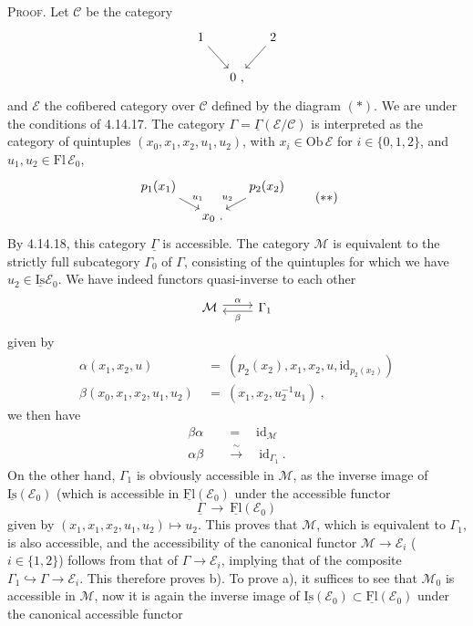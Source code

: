 \documentclass[11pt]{article}
\newcommand{\printedpage}[1]{\marginpar{\footnotesize p.~#1}}
\newcommand{\msp}[1]{\marginpar{\footnotesize [#1]}}
\newcommand{\uGamma}{\underline{\Gamma}}
\newcommand{\uFl}{\underline{\mathrm{Fl}}}
\newcommand{\uIs}{\underline{\mathrm{Is}}}
\newcommand{\Ob}{\mathrm{Ob}\,}
\newcommand{\Fl}{\mathrm{Fl}\,}
\newcommand{\id}{\mathrm{id}}
\begin{document}
\noindent\textsc{Proof}. Let $\mathcal{C}$ be the category
\[
\begin{tikzcd}[column sep=small]
1 \arrow[dr] & & 2 \arrow[dl] \\
& 0 \ , &
\end{tikzcd}
\]
and $\mathcal{E}$ the cofibered category over $\mathcal{C}$ defined by the diagram $(*)$. We are under the conditions of 4.14.17. The category $\Gamma = \uGamma(\mathcal{E}/\mathcal{C})$ is interpreted
\printedpage{151}
\msp{page 398}
as the category of quintuples $(x_0,x_1,x_2,u_1,u_2)$, with $x_i \in \Ob\mathcal{E}$ for $i \in \{0,1,2\}$, and $u_1, u_2 \in \Fl\mathcal{E}_0$,
\[
\begin{tikzcd}[column sep=small, row sep=small]
p_1(x_1) \arrow[dr, "u_1"] & & p_2(x_2) \arrow[dl, "u_2"'] \\
& x_0 \ . &
\end{tikzcd}
\tag*{$(**)$}
\]
By 4.14.18, this category $\uGamma$ is accessible. The category $\mathcal{M}$ is equivalent to the strictly full subcategory $\Gamma_0$ of $\Gamma$, consisting of the quintuples for which we have $u_2 \in \uIs\mathcal{E}_0$. We have indeed functors quasi-inverse to each other %
\[
\begin{tikzcd}
\mathcal{M} \arrow[r, shift left, "\alpha"] & \Gamma_1 \arrow[l, shift left, "\beta"]
\end{tikzcd}
\]
given by
\[
\begin{aligned}
\alpha(x_1,x_2,u) \ &= \ (p_2(x_2),x_1,x_2,u,\id_{p_2(x_2)})\\
\beta(x_0,x_1,x_2,u_1,u_2) \ &= \ (x_1,x_2,u_2^{-1}u_1) \ ,
\end{aligned}
\]
we then have
\[
\begin{aligned}
\beta\alpha \quad &= \quad \id_{\mathcal{M}}\\
\alpha\beta \quad &\xrightarrow{\ \sim\ } \quad \id_{\Gamma_1} \ .
\end{aligned}
\]
On the other hand, $\Gamma_1$ is obviously accessible in $\mathcal{M}$, as the inverse image of $\uIs(\mathcal{E}_0)$ (which %
\msp{page 399}
is accessible in $\uFl(\mathcal{E}_0)$ under the accessible functor
\[
\uGamma \ \longrightarrow \ \uFl(\mathcal{E}_0)
\]
given by $(x_1, x_1, x_2, u_1, u_2) \longmapsto u_2$. This proves that $\mathcal{M}$, which is equivalent to $\Gamma_1$, is also accessible, and the accessibility of the canonical functor $\mathcal{M} \longrightarrow \mathcal{E}_i$ ($i \in \{1,2\}$) follows from that of $\Gamma \longrightarrow \mathcal{E}_i$, implying that of the composite $\Gamma_1 \hookrightarrow \Gamma \longrightarrow \mathcal{E}_i$. This therefore proves b). To prove a), it suffices to see that $\mathcal{M}_0$ is accessible in $\mathcal{M}$, now it is again the inverse image of $\uIs(\mathcal{E}_0) \subset \uFl(\mathcal{E}_0)$ under the canonical accessible functor %
\end{document}
